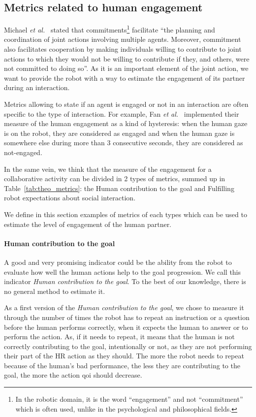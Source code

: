 \documentclass[a4paper,11pt,twoside]{StyleThese}
\begin{document}
\subsection{Metrics related to human engagement}\label{subsec:m_engag}
Michael \textit{et al.}~\cite{michael2016} stated that commitments\footnote{In the robotic domain, it is the word ``engagement'' and not ``commitment'' which is often used, unlike in the psychological and philosophical fields.} facilitate ``the planning and coordination of joint actions involving multiple agents. Moreover, commitment also facilitates cooperation by making individuals willing to contribute to joint actions to which they would not be willing to contribute if they, and others, were not committed to doing so''. As it is an important element of the joint action, we want to provide the robot with a way to estimate the engagement of its partner during an interaction. 

Metrics allowing to state if an agent is engaged or not in an interaction are often specific to the type of interaction. For example, Fan \textit{et al.}~\cite{fan2017} implemented their measure of the human engagement as a kind of hysteresis: when the human gaze is on the robot, they are considered as engaged and when the human gaze is somewhere else during more than 3 consecutive seconds, they are considered as not-engaged. 

In the same vein, we think that the measure of the engagement for a collaborative activity can be divided in 2 types of metrics, summed up in Table~\ref{tab:theo_metrics}: the Human contribution to the goal and Fulfilling robot expectations about social interaction.

We define in this section examples of metrics of each types which can be used to estimate the level of engagement of the human partner. 

\paragraph{Human contribution to the goal}\label{subsubsec:h_contrib}

A good and very promising indicator could be the ability from the robot to evaluate how well the human actions help to the goal progression. We call this indicator \textit{Human contribution to the goal}. To the best of our knowledge, there is no general method to estimate it. 

As a first version of the \textit{Human contribution to the goal}, we chose to measure it through the number of times the robot has to repeat an instruction or a question before the human performs correctly, when it expects the human to answer or to perform the action. As, if it needs to repeat, it means that the human is not correctly contributing to the goal, intentionally or not, as they are not performing their part of the HR action as they should. The more the robot needs to repeat because of the human's bad performance, the less they are contributing to the goal, the more the action \acrshort{qoi} should decrease. 
\end{document}
